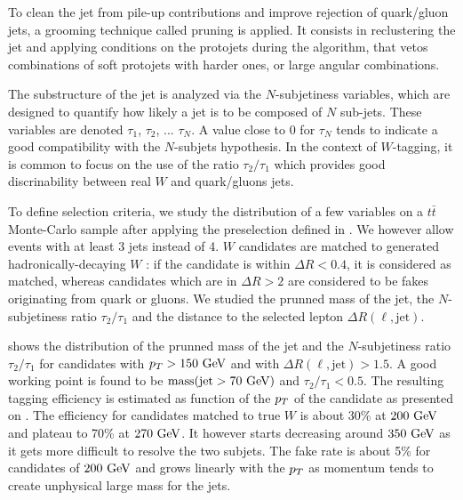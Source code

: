             To clean the jet from pile-up contributions and improve rejection of
            quark/gluon jets, a grooming technique called pruning is applied. It
            consists in reclustering the jet and applying
            conditions on the protojets during the algorithm, that vetos combinations of
            soft protojets with harder ones, or large angular combinations.

            The substructure of the jet is analyzed via the $N$-subjetiness variables,
            which are designed to quantify how likely a jet is to be composed of $N$
            sub-jets.  These variables are denoted $\tau_1$,
            $\tau_2$, ... $\tau_N$. A value close to 0 for $\tau_N$ tends to indicate
            a good compatibility with the $N$-subjets hypothesis. In the context of
            $W$-tagging, it is common to focus on the use of the ratio $\tau_2/\tau_1$
            which provides good discrinability between real $W$ and quark/gluons jets.

            To define selection criteria, we study the distribution of a few variables
            on a $t\bar{t}$ Monte-Carlo sample after applying the preselection defined in
            . We however allow events with at
            least 3 jets instead of 4. $W$ candidates are matched to generated
            hadronically-decaying $W$ : if the candidate is within $\Delta R < 0.4$, it
            is considered as matched, whereas candidates which are in $\Delta R > 2$ are
            considered to be fakes originating from quark or gluons. We studied the
            prunned mass of the jet, the $N$-subjetiness ratio $\tau_2 / \tau_1$ and the
            distance to the selected lepton $\Delta R (\ell,\text{jet})$.

             shows the distribution of the prunned mass of
            the jet and the $N$-subjetiness ratio $\tau_2 / \tau_1$ for candidates with
            $p_T > 150~\text{GeV}$ and with $\Delta R(\ell,\text{jet}) > 1.5$. A good working point
            is found to be $\text{mass}(\text{jet} > 70~\text{GeV})$ and $\tau_2 / \tau_1 < 0.5$.
            The resulting tagging efficiency is estimated as function of the $p_T$ of the
            candidate as presented on .
            The efficiency for candidates matched
            to true $W$ is about 30\% at $200~\text{GeV}$ and plateau to 70\% at $270~\text{GeV}$. It
            however starts decreasing around $350~\text{GeV}$ as it gets more difficult to resolve
            the two subjets. The fake rate is about 5\% for candidates of $200~\text{GeV}$ and
            grows linearly with the $p_T$ as momentum tends to create unphysical large
            mass for the jets.

